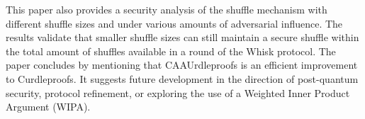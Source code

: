 \begin{center}
\begin{tcolorbox}
        This paper also provides a security analysis of the shuffle mechanism with different shuffle sizes and under various amounts of adversarial influence.
        The results validate that smaller shuffle sizes can still maintain a secure shuffle within the total amount of shuffles available in a round of the Whisk protocol.
        The paper concludes by mentioning that CAAUrdleproofs is an efficient improvement to Curdleproofs.
        It suggests future development in the direction of post-quantum security, protocol refinement, or exploring the use of a Weighted Inner Product Argument (WIPA).



        \end{tcolorbox}
    \end{center}